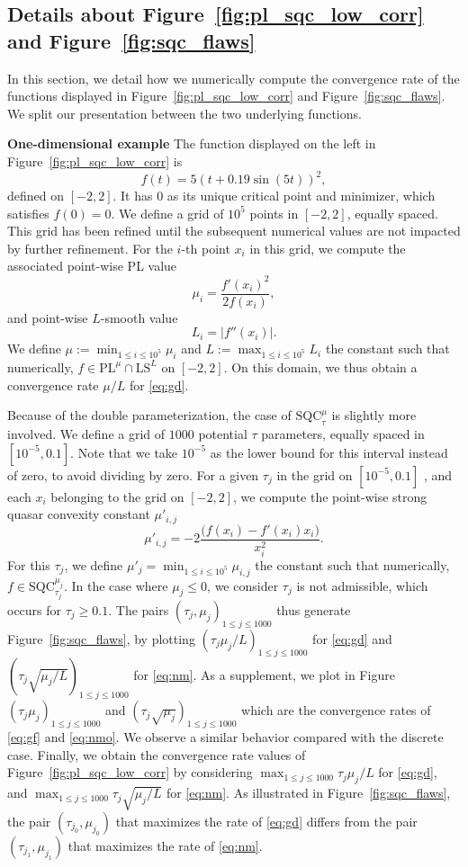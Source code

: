 \documentclass{article}
\def\pl{{\text{PL}^\mu}}
\newcommand{\sqc}{\text{SQC}_{\tau}^{\mu}}
\newcommand{\ls}{\text{LS}^{L}}
\newcommand{\sqcf}[2]{\text{SQC}_{#1}^{#2}}
\theoremstyle{plain}
\theoremstyle{definition}
\theoremstyle{remark}
\begin{document}
\subsection{Details about Figure~\ref{fig:pl_sqc_low_corr} and Figure~\ref{fig:sqc_flaws}}\label{app:param_details}
In this section, we detail how we numerically compute the convergence rate of the functions displayed in Figure~\ref{fig:pl_sqc_low_corr} and Figure~\ref{fig:sqc_flaws}. We split our presentation between the two underlying functions.

\textbf{One-dimensional example \:}
The function displayed on the left in Figure~\ref{fig:pl_sqc_low_corr} is
\[f(t) = 5(t+0.19\sin(5t))^2, \]
defined on $[-2,2]$. It has $0$ as its unique critical point and minimizer, which satisfies $f(0) = 0$. We define a grid of $10^{5}$ points in $[-2,2]$, equally spaced. This grid has been refined until the subsequent numerical values are not impacted by further refinement. For the $i$-th point $x_i$ in this grid, we compute the associated point-wise PL value
\[ \mu_i = \frac{f'(x_i)^2}{2f(x_i)},  \]
and point-wise $L$-smooth value
\[ L_i = |f''(x_i)|.\]
We define $\mu := \min_{1\le i\le 10^5} \mu_i$ and $L := \max_{1\le i \le 10^5} L_i$ the constant such that numerically, $f \in \pl \cap \ls$ on $[-2,2]$. On this domain, we thus obtain a convergence rate $\mu/L$ for \eqref{eq:gd}.

Because of the double parameterization, the case of $\sqc$ is slightly more involved. We define a grid of $1000$ potential $\tau$ parameters, equally spaced in $[10^{-5},0.1]$. Note that we take $10^{-5}$ as the lower bound for this interval instead of zero, to avoid dividing by zero. For a given $\tau_j$ in the grid on $[10^{-5},0.1]$ , and each $x_i$ belonging to the grid on $[-2,2]$, we compute the point-wise strong quasar convexity constant $\mu'_{i,j}$
\[ \mu'_{i,j} = -2\frac{\Big( f(x_i) - f'(x_i)x_i \Big)}{x_i^2}.  \]
For this $\tau_j$, we define $\mu'_j = \min_{1\le i \le 10^5} \mu_{i,j}$ the constant such that numerically, $f \in \sqcf{\tau_j}{\mu_j}$. In the case where $\mu_j \le 0$, we consider $\tau_j$ is not admissible, which occurs for $\tau_j \ge 0.1$. The pairs $(\tau_j,\mu_j)_{1\le j\le 1000}$ thus generate Figure~\ref{fig:sqc_flaws}, by plotting $(\tau_j \mu_j/L)_{1\le j \le 1000 }$ for \eqref{eq:gd} and $(\tau_j \sqrt{\mu_j/L})_{1\le j \le 1000 }$ for \eqref{eq:nm}.  As a supplement, we plot in Figure~ $(\tau_j \mu_j)_{1\le j \le 1000 }$ and $(\tau_j \sqrt{\mu_j})_{1\le j \le 1000 }$ which are the convergence rates of \eqref{eq:gf} and \eqref{eq:nmo}. We observe a similar behavior compared with the discrete case. Finally, we obtain the convergence rate values of Figure~\ref{fig:pl_sqc_low_corr} by considering $\max_{1\le j \le 1000} \tau_j \mu_j/L$ for \eqref{eq:gd}, and $\max_{1\le j \le 1000} \tau_j \sqrt{\mu_j/L}$ for \eqref{eq:nm}. As illustrated in Figure~\ref{fig:sqc_flaws}, the pair $(\tau_{j_0},\mu_{j_0})$ that maximizes the rate of \eqref{eq:gd} differs from the pair $(\tau_{j_1},\mu_{j_1})$ that maximizes the rate of \eqref{eq:nm}.
\end{document}

